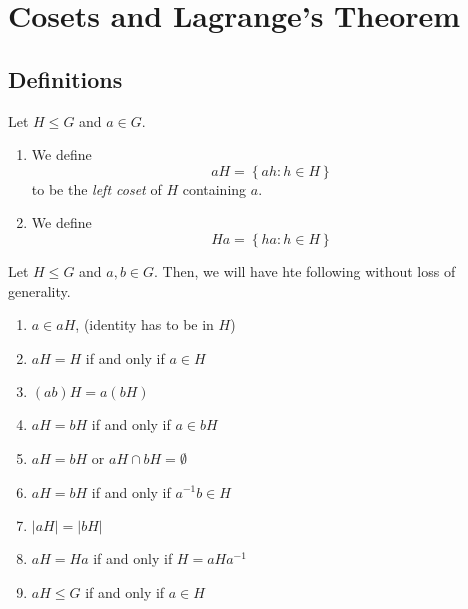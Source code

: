 \chapter{Cosets and Lagrange's Theorem}

\section{Definitions}

\begin{definition}[Coset]
    Let \(H \leq G\) and \(a \in G\).

    \begin{enumerate}
        \item We define 
            \[
                aH = \left\{ah : h \in H\right\}
            \]
            to be the \textit{left coset} of \(H\) containing \(a\).
        \item We define
            \[
                Ha = \left\{ha : h \in H\right\}
            \]
    \end{enumerate}
\end{definition}

\begin{lemma}
    Let \(H \leq G\) and \(a, b \in G\). Then, we will have hte following without loss of generality.
    \begin{enumerate}
        \item \(a \in aH\), (identity has to be in \(H\))
        \item \(aH = H\) if and only if \(a \in H\)
        \item \((ab)H = a(bH)\)
        \item \(aH = bH\) if and only if \(a \in bH\)
        \item \(aH = bH\) or \(aH \cap bH = \emptyset\)
        \item \(aH = bH\) if and only if \(a^{-1}b \in H\)
        \item \(|aH| = |bH|\)
        \item \(aH = Ha\) if and only if \(H = aHa^{-1}\)
        \item \(aH \leq G\) if and only if \(a \in H\)
    \end{enumerate}
\end{lemma}

